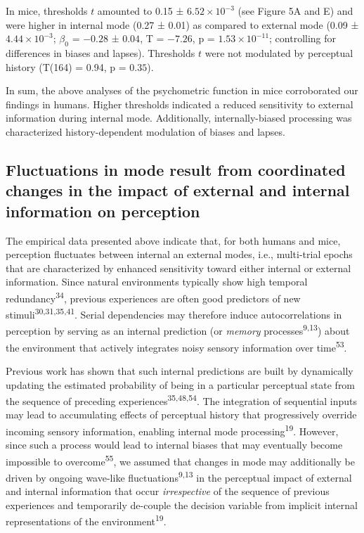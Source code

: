 \documentclass[
]{article}
\begin{document}
In mice, thresholds \(t\) amounted to 0.15 ±
\ensuremath{6.52\times 10^{-3}} (see Figure 5A and E) and were higher in
internal mode (0.27 ± 0.01) as compared to external mode (0.09 ±
\ensuremath{4.44\times 10^{-3}}; \(\beta_0\) = \(-0.28\) ± \(0.04\), T =
\(-7.26\), p = \(\ensuremath{1.53\times 10^{-11}}\); controlling for
differences in biases and lapses). Thresholds \(t\) were not modulated
by perceptual history (T(164) = 0.94, p = \(0.35\)).

In sum, the above analyses of the psychometric function in mice
corroborated our findings in humans. Higher thresholds indicated a
reduced sensitivity to external information during internal mode.
Additionally, internally-biased processing was characterized
history-dependent modulation of biases and lapses.

\hypertarget{fluctuations-in-mode-result-from-coordinated-changes-in-the-impact-of-external-and-internal-information-on-perception}{%
\subsection{Fluctuations in mode result from coordinated changes in the
impact of external and internal information on
perception}\label{fluctuations-in-mode-result-from-coordinated-changes-in-the-impact-of-external-and-internal-information-on-perception}}

The empirical data presented above indicate that, for both humans and
mice, perception fluctuates between internal an external modes, i.e.,
multi-trial epochs that are characterized by enhanced sensitivity toward
either internal or external information. Since natural environments
typically show high temporal redundancy\textsuperscript{34}, previous
experiences are often good predictors of new
stimuli\textsuperscript{30,31,35,41}. Serial dependencies may therefore
induce autocorrelations in perception by serving as an internal
prediction (or \emph{memory} processes\textsuperscript{9,13}) about the
environment that actively integrates noisy sensory information over
time\textsuperscript{53}.

Previous work has shown that such internal predictions are built by
dynamically updating the estimated probability of being in a particular
perceptual state from the sequence of preceding
experiences\textsuperscript{35,48,54}. The integration of sequential
inputs may lead to accumulating effects of perceptual history that
progressively override incoming sensory information, enabling internal
mode processing\textsuperscript{19}. However, since such a process would
lead to internal biases that may eventually become impossible to
overcome\textsuperscript{55}, we assumed that changes in mode may
additionally be driven by ongoing wave-like
fluctuations\textsuperscript{9,13} in the perceptual impact of external
and internal information that occur \emph{irrespective} of the sequence
of previous experiences and temporarily de-couple the decision variable
from implicit internal representations of the
environment\textsuperscript{19}.
\end{document}
